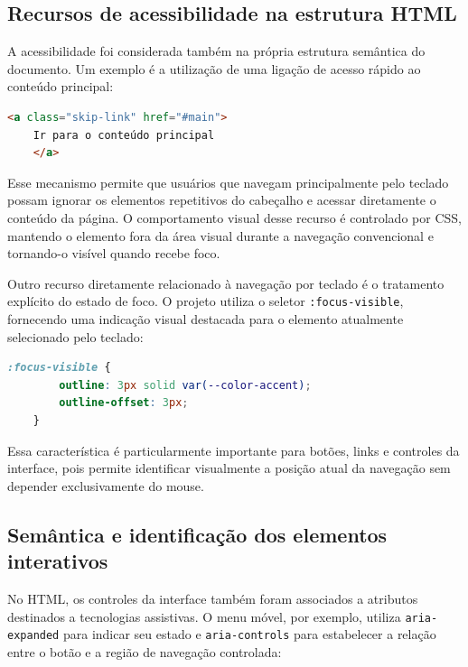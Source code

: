 \vspace{5mm}
\subsection{Recursos de acessibilidade na estrutura HTML}

A acessibilidade foi considerada também na própria estrutura semântica do documento. Um exemplo é a utilização de uma ligação de acesso rápido ao conteúdo principal:

\begin{lstlisting}[language=HTML, caption={Mecanismo de acesso direto ao conteúdo principal.}, label={lst:skiplink}]
	<a class="skip-link" href="#main">
	Ir para o conteúdo principal
	</a>
\end{lstlisting}

Esse mecanismo permite que usuários que navegam principalmente pelo teclado possam ignorar os elementos repetitivos do cabeçalho e acessar diretamente o conteúdo da página. O comportamento visual desse recurso é controlado por CSS, mantendo o elemento fora da área visual durante a navegação convencional e tornando-o visível quando recebe foco.

Outro recurso diretamente relacionado à navegação por teclado é o tratamento explícito do estado de foco. O projeto utiliza o seletor \texttt{:focus-visible}, fornecendo uma indicação visual destacada para o elemento atualmente selecionado pelo teclado:

\begin{lstlisting}[language=CSS, caption={Indicação visual do elemento em foco.}, label={lst:focus}]
	:focus-visible {
		outline: 3px solid var(--color-accent);
		outline-offset: 3px;
	}
\end{lstlisting}

Essa característica é particularmente importante para botões, links e controles da interface, pois permite identificar visualmente a posição atual da navegação sem depender exclusivamente do mouse.

\vspace{5mm}
\subsection{Semântica e identificação dos elementos interativos}

No HTML, os controles da interface também foram associados a atributos destinados a tecnologias assistivas. O menu móvel, por exemplo, utiliza \texttt{aria-expanded} para indicar seu estado e \texttt{aria-controls} para estabelecer a relação entre o botão e a região de navegação controlada:

